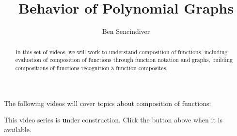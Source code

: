 \documentclass{ximera}
\title[Prerequisite Videos: ]{Behavior of Polynomial Graphs}
\author{Ben Sencindiver}
\begin{document}
\begin{abstract}
  In this set of videos, we will work to understand
  composition of functions, including evaluation 
  of composition of functions through function 
  notation and graphs, building compositions of functions
  recognition a function composites.
\end{abstract}
\maketitle

The following videos will cover topics about composition of functions:


This video series is {\textbf under construction}. Click the  button above when it is available.
\end{document}
